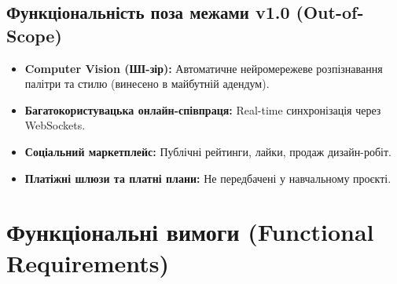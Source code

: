 \documentclass[12pt,a4paper]{article}
\begin{document}
\subsection{Функціональність поза межами v1.0 (Out-of-Scope)}
\begin{itemize}[noitemsep]
    \item \textbf{Computer Vision (ШІ-зір):} Автоматичне нейромережеве розпізнавання палітри та стилю (винесено в майбутній адендум).
    \item \textbf{Багатокористувацька онлайн-співпраця:} Real-time синхронізація через WebSockets.
    \item \textbf{Соціальний маркетплейс:} Публічні рейтинги, лайки, продаж дизайн-робіт.
    \item \textbf{Платіжні шлюзи та платні плани:} Не передбачені у навчальному проєкті.
\end{itemize}

\section{Функціональні вимоги (Functional Requirements)}
\end{document}
